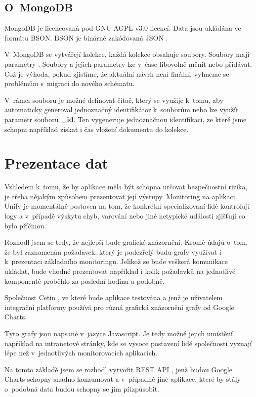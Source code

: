 \documentclass[thesis=M,czech]{FITthesis}[2012/10/20]
\begin{document}
		\subsection{O~MongoDB}
			MongoDB je licencovaná pod  GNU AGPL v3.0 \cite{mongo_gnu} licencí. Data jsou ukládána ve formátu BSON. BSON je binárně zakódovaná JSON \cite{bsonspec.org}.

			V~MongoDB se vytvářejí kolekce, každá kolekce obsahuje soubory. Soubory mají parametry \cite{mongoDB}. Soubory a jejich parametry lze v~čase libovolně měnit nebo přidávat. Což je výhoda, pokud zjistíme, že aktuální návrh není finální, vyhneme se problémům s~migrací do nového schématu.

			V~rámci souboru je možné definovat čítač, který se využije k~tomu, aby automaticky generoval jednoznačný identifikátor k~souborům nebo lze využít parametr souboru \textbf{\_id}. Ten vygeneruje jednoznačnou identifikaci, ze které jsme schopni například získat i čas vložení dokumentu do kolekce. 

		
	\section{Prezentace dat}
		\label{sec:data_prezentation}
		Vzhledem k~tomu, že by aplikace měla být schopna určovat bezpečnostní rizika, je třeba nějakým způsobem prezentovat její výstupy. Monitoring na aplikaci Unify je momentálně postaven na tom, že konkrétní specializovaní lidé kontrolují logy a v~případě výskytu chyb, varování nebo jiné netypické události zjišťují co bylo příčinou.
		
		Rozhodl jsem se tedy, že nejlepší bude grafické znázornění. Kromě údajů o~tom, že byl zaznamenán požadavek, který je podezřelý budu grafy využívat i k~prezentaci základního monitoringu. Jelikož se bude veškerá komunikace ukládat, bude vhodné prezentovat například i kolik požadavků na jednotlivé komponentě proběhlo za poslední hodinu a podobně.
		
		Společnost Cetin \cite{cetin}, ve které bude aplikace testována a jenž je uživatelem integrační platformy používá pro různá grafická znázornění grafy od Google Charts\cite{googleCharts}. 
		
		Tyto grafy jsou napsané v~jazyce Javascript. Je tedy možné jejich umístění například na intranetové stránky, kde se vysoce postavení lidé společnosti vyznají lépe než v~jednotlivých monitorovacích aplikacích.
		
		Na tomto základě jsem se rozhodl vytvořit REST API \cite{rest}, jenž budou Google Charts schopny snadno konzumovat a v~případné jiné aplikace, které by stály o~podobná data budou schopny se jim přizpůsobit.
		
\end{document}
